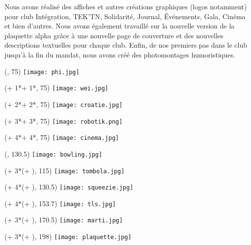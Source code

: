 Nous avons réalisé des affiches et autres créations graphiques (logos notamment) pour club Intégration, TEK'TN, Solidarité, Journal, Événements, Gala, Cinéma et bien d'autres. Nous avons également travaillé sur la nouvelle version de la plaquette alpha grâce à une nouvelle page de couverture et des nouvelles descriptions textuelles pour chaque club. Enfin, de nos premiers pas dans le club jusqu'à la fin du mandat, nous avons créé des photomontages humoristiques.

\begin{textblock}{0}(\fixMargin, 75)
	\texttt{[image: phi.jpg]}
\end{textblock}

\begin{textblock}{0}({\numexpr \fixMargin + 1*\sizeMedia + 1*\margin}, 75)
	\texttt{[image: wei.jpg]}
\end{textblock}

\begin{textblock}{0}({\numexpr \fixMargin + 2*\sizeMedia + 2*\margin}, 75)
	\texttt{[image: croatie.jpg]}
\end{textblock}

\begin{textblock}{0}(\numexpr \fixMargin + 3*\sizeMedia + 3*\margin, 75)
	\texttt{[image: robotik.png]}
\end{textblock}

\begin{textblock}{0}({\numexpr \fixMargin + 4*\sizeMedia + 4*\margin}, 75)
	\texttt{[image: cinema.jpg]}
\end{textblock}

\begin{textblock}{0}(\fixMargin, 130.5)
	\texttt{[image: bowling.jpg]}
\end{textblock}

\begin{textblock}{0}({\numexpr \fixMargin + 3*(\sizeMedia + \margin)}, 115)
	\texttt{[image: tombola.jpg]}
\end{textblock}

\begin{textblock}{0}({\numexpr \fixMargin + 4*(\sizeMedia + \margin)}, 130.5)
	\texttt{[image: squeezie.jpg]}
\end{textblock}

\begin{textblock}{0}({\numexpr \fixMargin + 4*(\sizeMedia + \margin)}, 153.7)
	\texttt{[image: tls.jpg]}
\end{textblock}

\begin{textblock}{0}({\numexpr \fixMargin + 3*(\sizeMedia + \margin)}, 170.5)
	\texttt{[image: marti.jpg]}
\end{textblock}

\begin{textblock}{0}({\numexpr \fixMargin + 3*(\sizeMedia + \margin)}, 198)
	\texttt{[image: plaquette.jpg]}
\end{textblock}